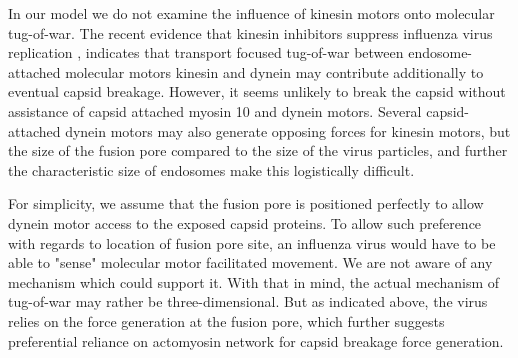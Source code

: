 In our model we do not examine the influence of kinesin motors onto molecular tug-of-war. The recent evidence that kinesin inhibitors suppress influenza virus replication \cite{cho2020selective, kim2021kif11}, indicates that transport focused tug-of-war between endosome-attached molecular motors kinesin and dynein may contribute additionally to eventual capsid breakage. However, it seems unlikely to break the capsid  without assistance of capsid attached myosin 10 and dynein motors. Several capsid-attached dynein motors may also generate opposing forces for kinesin motors, but the size of the fusion pore \cite{lee2010architecture} compared to the size of the virus particles, and further the characteristic size of endosomes \cite{ganley2004rab9} make this logistically difficult.

For simplicity, we assume that the fusion pore is positioned perfectly to allow dynein motor access to the exposed capsid proteins. To allow such preference with regards to location of fusion pore site, an influenza virus would have to be able to "sense" molecular motor facilitated movement. We are not aware of any mechanism which could support it. With that in mind, the actual mechanism of tug-of-war may rather be three-dimensional. But as indicated above, the virus relies on the force generation at the fusion pore, which further suggests preferential reliance on actomyosin network for capsid breakage force generation.